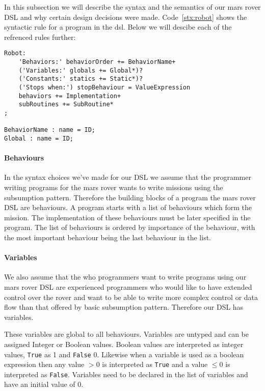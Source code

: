 In this subsection we will describe the syntax and the semantics of our mars
rover DSL and why certain design decisions were made. Code~\ref{stx:robot} shows
the syntactic rule for a program in the dsl. Below we will descibe each of the
refrenced rules further:

\begin{lstlisting}[caption=Main syntactic rule, label=stc:robot]
Robot:
    'Behaviors:' behaviorOrder += BehaviorName+
    ('Variables:' globals += Global*)?
    ('Constants:' statics += Static*)?
    ('Stops when:') stopBehaviour = ValueExpression
    behaviors += Implementation+
    subRoutines += SubRoutine*
;

BehaviorName : name = ID;
Global : name = ID;
\end{lstlisting}

\paragraph{Behaviours} In the syntax choices we've made for our DSL we assume 
that the programmer
writing programs for the mars rover wants to write missions using the 
subsumption pattern. Therefore the building blocks of a program the mars rover 
DSL are behaviours. A program starts with a list of behaviours which form the 
mission. The implementation of these behaviours must be later specified in the
program. The list of behaviours is ordered by importance of the behaviour, with
the most important behaviour being the last behaviour in the list. 

\paragraph{Variables} We also assume that the who programmers want to write 
programs using our mars
rover DSL are experienced programmers who would like to have extended control
over the rover and want to be able to write more complex control or data flow 
than that offered by basic subsumption pattern. Therefore our DSL has variables.

These variables are global to all behaviours. Variables are untyped and can be 
assigned Integer or Boolean values. Boolean values are interpreted as integer
values, \texttt{True} as 1 and \texttt{False} 0. Likewise when a variable is 
used as a boolean expression then any value $>0$ is interpreted as \texttt{True}
and a value $\leq 0$ is interpreted as \texttt{False}. Variables need to be 
declared in the list of variables and have an initial value of $0$.

